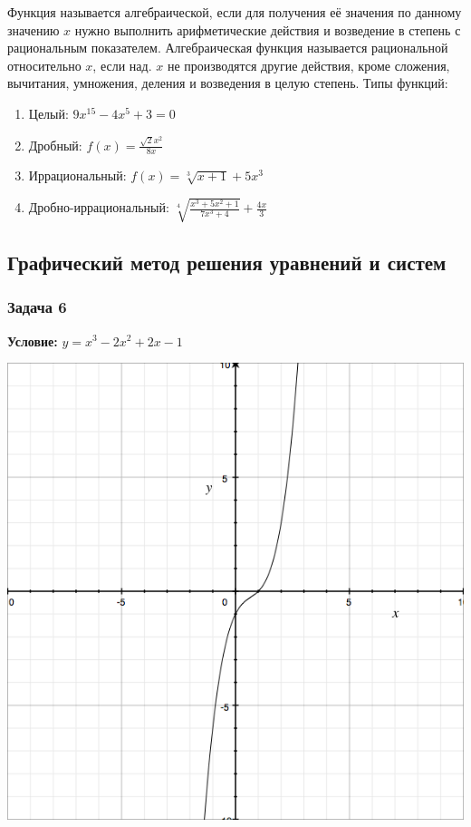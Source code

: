\documentclass[]{article}
\begin{document}
Функция называется алгебраической, если для получения её значения по данному значению $x$ нужно выполнить арифметические действия и возведение в степень с рациональным показателем. Алгебраическая функция называется рациональной относительно $x$, если над. $x$ не производятся другие действия, кроме сложения, вычитания, умножения, деления и возведения в целую степень.
\newline
Типы функций:
\begin{enumerate}
\item Целый: $9x^{15}-4x^{5}+3=0$
\item Дробный: $f(x) = \frac{\sqrt{2}x^2}{8x}$
\item Иррациональный: $f(x)=\sqrt[3]{x+1}+5x^3$
\item Дробно-иррациональный: $\sqrt[4]{\frac{x^3+5x^2+1}{7x^3+4}}+\frac{4x}{3}$
\end{enumerate}

\subsection{Графический метод решения уравнений и систем}

\subsubsection{Задача 6}

\textbf{Условие: } $y=x^3-2x^2+2x-1$
\newline

\begingroup
\centering
\includegraphics[scale=0.3]{graph5}
\endgroup
\end{document}
